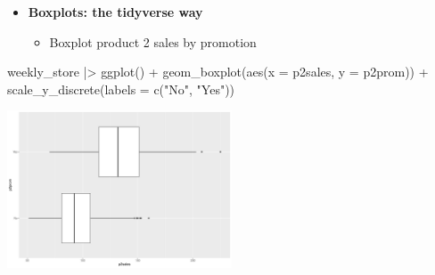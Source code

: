 \documentclass[
  ignorenonframetext,
]{beamer}
\newenvironment{Shaded}{\begin{snugshade}}{\end{snugshade}}
\newcommand{\AttributeTok}[1]{\textcolor[rgb]{0.40,0.45,0.13}{#1}}
\newcommand{\FunctionTok}[1]{\textcolor[rgb]{0.28,0.35,0.67}{#1}}
\newcommand{\NormalTok}[1]{\textcolor[rgb]{0.00,0.23,0.31}{#1}}
\newcommand{\SpecialCharTok}[1]{\textcolor[rgb]{0.37,0.37,0.37}{#1}}
\newcommand{\StringTok}[1]{\textcolor[rgb]{0.13,0.47,0.30}{#1}}
\providecommand{\tightlist}{%
  \setlength{\itemsep}{0pt}\setlength{\parskip}{0pt}}\usepackage{longtable,booktabs,array}
\begin{document}
\begin{frame}[fragile]{}
\label{section-26}
\begin{itemize}
\item
  \textbf{Boxplots: the tidyverse way}

  \begin{itemize}
  \tightlist
  \item
    Boxplot product 2 sales by promotion
  \end{itemize}
\end{itemize}

\tiny

\begin{Shaded}
\begin{Highlighting}[]
\NormalTok{weekly\_store }\SpecialCharTok{|\textgreater{}} \FunctionTok{ggplot}\NormalTok{() }\SpecialCharTok{+} 
  \FunctionTok{geom\_boxplot}\NormalTok{(}\FunctionTok{aes}\NormalTok{(}\AttributeTok{x =}\NormalTok{ p2sales, }\AttributeTok{y =}\NormalTok{ p2prom)) }\SpecialCharTok{+} 
  \FunctionTok{scale\_y\_discrete}\NormalTok{(}\AttributeTok{labels =} \FunctionTok{c}\NormalTok{(}\StringTok{"No"}\NormalTok{, }\StringTok{"Yes"}\NormalTok{))}
\end{Highlighting}
\end{Shaded}

\begin{center}
\includegraphics[width=0.5\textwidth,height=\textheight]{003_describing_data_files/figure-beamer/unnamed-chunk-25-1.pdf}
\end{center}
\end{frame}
\end{document}
